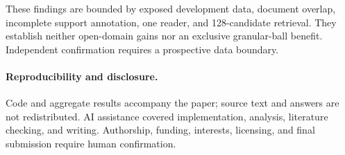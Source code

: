 \documentclass[runningheads]{llncs}
\begin{document}
These findings are bounded by exposed development data, document overlap,
incomplete support annotation, one reader, and 128-candidate retrieval.
They establish neither open-domain gains nor an exclusive granular-ball
benefit. Independent confirmation requires a prospective data boundary.

\paragraph{Reproducibility and disclosure.}
Code and aggregate results accompany the paper; source text and answers
are not redistributed. AI assistance covered implementation, analysis,
literature checking, and writing. Authorship, funding, interests, licensing,
and final submission require human confirmation.

\clearpage


\end{document}

